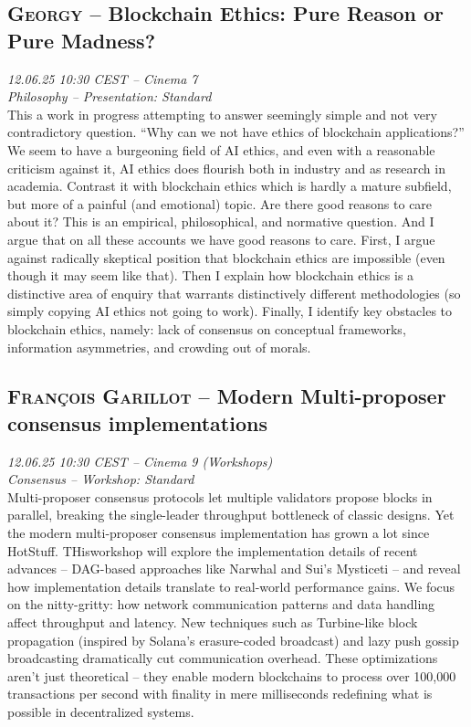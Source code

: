 \clearpage
\subsection {\textsc{Georgy}  -- Blockchain Ethics: Pure Reason or Pure Madness?} \noindent \textit {12.06.25 10:30 CEST -- Cinema 7\\ Philosophy -- Presentation: Standard}\\[1em] This a work in progress attempting to answer seemingly simple and not very contradictory question.  ``Why can we not have ethics of blockchain applications?'' We seem to have a burgeoning field of AI ethics, and even with a reasonable criticism against it, AI ethics does flourish both in industry and as research in academia. Contrast it with blockchain ethics which is hardly a mature subfield, but more of a painful (and emotional) topic. Are there good reasons to care about it? This is an empirical, philosophical, and normative question. And I argue that on all these accounts we have good reasons to care. First, I argue against radically skeptical position that blockchain ethics are impossible (even though it may seem like that). Then I explain how blockchain ethics is a distinctive area of enquiry that warrants distinctively different methodologies (so simply copying AI ethics not going to work). Finally, I identify key obstacles to blockchain ethics, namely: lack of consensus on conceptual frameworks, information asymmetries, and crowding out of morals.

\clearpage
\subsection {\textsc{François  Garillot}  -- Modern Multi-proposer consensus implementations} \noindent \textit {12.06.25 10:30 CEST -- Cinema 9 (Workshops)\\ Consensus -- Workshop: Standard}\\[1em] Multi-proposer consensus protocols let multiple validators propose blocks in parallel, breaking the single-leader throughput bottleneck of classic designs. Yet the modern multi-proposer consensus implementation has grown a lot since HotStuff. THisworkshop will explore the implementation details of recent advances – DAG-based approaches like Narwhal and Sui’s Mysticeti – and reveal how implementation details translate to real-world performance gains. We focus on the nitty-gritty: how network communication patterns and data handling affect throughput and latency. New techniques such as Turbine-like block propagation (inspired by Solana’s erasure-coded broadcast) and lazy push gossip broadcasting dramatically cut communication overhead. These optimizations aren’t just theoretical – they enable modern blockchains to process over 100,000 transactions per second with finality in mere milliseconds​ redefining what is possible in decentralized systems.

